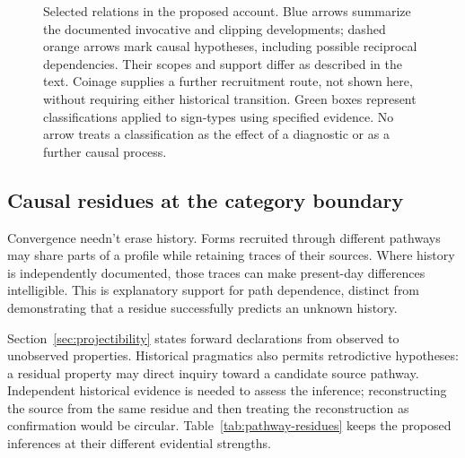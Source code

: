 \documentclass[12pt]{article}
\newcommand{\intjshort}[1]{Intj\textsubscript{#1}}
\begin{document}
\begin{figure}[htbp]
{%
}
\caption{Selected relations in the proposed account. Blue arrows summarize the documented invocative and clipping developments; dashed orange arrows mark causal hypotheses, including possible reciprocal dependencies. Their scopes and support differ as described in the text. Coinage supplies a further recruitment route, not shown here, without requiring either historical transition. Green boxes represent classifications applied to sign-types using specified evidence. No arrow treats a classification as the effect of a diagnostic or as a further causal process.}
\label{fig:causal-network}
\end{figure}

\subsection{Causal residues at the category boundary}\label{sec:residues}

Convergence needn't erase history. Forms recruited through different pathways may share parts of a profile while retaining traces of their sources. Where history is independently documented, those traces can make present-day differences intelligible. This is explanatory support for path dependence, distinct from demonstrating that a residue successfully predicts an unknown history.

Section~\ref{sec:projectibility} states forward declarations from observed to unobserved properties. Historical pragmatics also permits retrodictive hypotheses: a residual property may direct inquiry toward a candidate source pathway. Independent historical evidence is needed to assess the inference; reconstructing the source from the same residue and then treating the reconstruction as confirmation would be circular. Table~\ref{tab:pathway-residues} keeps the proposed inferences at their different evidential strengths.
\end{document}
